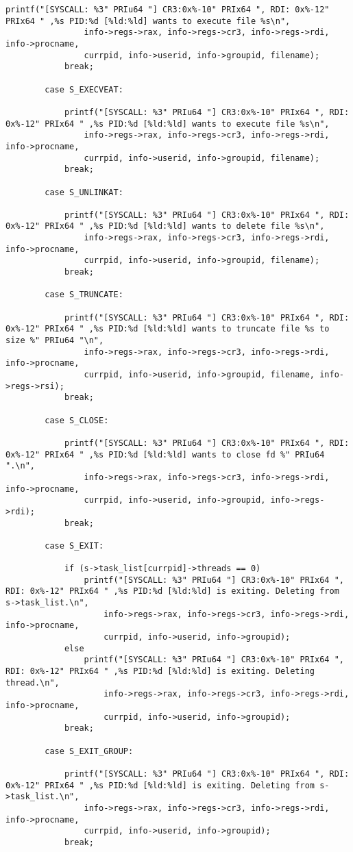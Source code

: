 {\begin{lstlisting}[style=CStyle]
			printf("[SYSCALL: %3" PRIu64 "] CR3:0x%-10" PRIx64 ", RDI: 0x%-12" PRIx64 " ,%s PID:%d [%ld:%ld] wants to execute file %s\n",
				info->regs->rax, info->regs->cr3, info->regs->rdi, info->procname,
				currpid, info->userid, info->groupid, filename);
			break;	
		
		case S_EXECVEAT:
		
			printf("[SYSCALL: %3" PRIu64 "] CR3:0x%-10" PRIx64 ", RDI: 0x%-12" PRIx64 " ,%s PID:%d [%ld:%ld] wants to execute file %s\n",
				info->regs->rax, info->regs->cr3, info->regs->rdi, info->procname,
				currpid, info->userid, info->groupid, filename);
			break;	
		
		case S_UNLINKAT:
		
			printf("[SYSCALL: %3" PRIu64 "] CR3:0x%-10" PRIx64 ", RDI: 0x%-12" PRIx64 " ,%s PID:%d [%ld:%ld] wants to delete file %s\n",
				info->regs->rax, info->regs->cr3, info->regs->rdi, info->procname,
				currpid, info->userid, info->groupid, filename);
			break;	
		
		case S_TRUNCATE:
		
			printf("[SYSCALL: %3" PRIu64 "] CR3:0x%-10" PRIx64 ", RDI: 0x%-12" PRIx64 " ,%s PID:%d [%ld:%ld] wants to truncate file %s to size %" PRIu64 "\n",
				info->regs->rax, info->regs->cr3, info->regs->rdi, info->procname,
				currpid, info->userid, info->groupid, filename, info->regs->rsi);
			break;	
		
		case S_CLOSE:
			
			printf("[SYSCALL: %3" PRIu64 "] CR3:0x%-10" PRIx64 ", RDI: 0x%-12" PRIx64 " ,%s PID:%d [%ld:%ld] wants to close fd %" PRIu64 ".\n",
				info->regs->rax, info->regs->cr3, info->regs->rdi, info->procname,
				currpid, info->userid, info->groupid, info->regs->rdi);
			break;	
		
		case S_EXIT:
		
			if (s->task_list[currpid]->threads == 0)
				printf("[SYSCALL: %3" PRIu64 "] CR3:0x%-10" PRIx64 ", RDI: 0x%-12" PRIx64 " ,%s PID:%d [%ld:%ld] is exiting. Deleting from s->task_list.\n",
					info->regs->rax, info->regs->cr3, info->regs->rdi, info->procname,
					currpid, info->userid, info->groupid);
			else
				printf("[SYSCALL: %3" PRIu64 "] CR3:0x%-10" PRIx64 ", RDI: 0x%-12" PRIx64 " ,%s PID:%d [%ld:%ld] is exiting. Deleting thread.\n",
					info->regs->rax, info->regs->cr3, info->regs->rdi, info->procname,
					currpid, info->userid, info->groupid);
			break;
		
		case S_EXIT_GROUP:
		
			printf("[SYSCALL: %3" PRIu64 "] CR3:0x%-10" PRIx64 ", RDI: 0x%-12" PRIx64 " ,%s PID:%d [%ld:%ld] is exiting. Deleting from s->task_list.\n",
				info->regs->rax, info->regs->cr3, info->regs->rdi, info->procname,
				currpid, info->userid, info->groupid);
			break;	
		

\end{lstlisting}}
